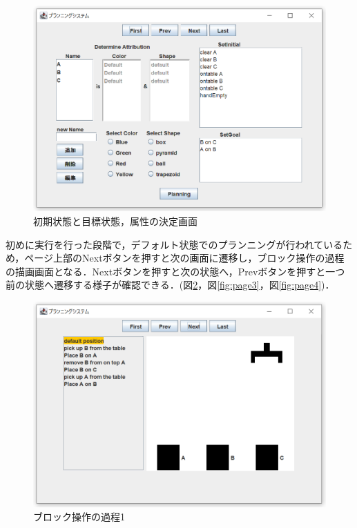 \documentclass[uplatex,12pt]{jsarticle}
\begin{document}
\begin{figure}[htbp]
  \begin{center}
    \includegraphics[scale=0.6]{images/page1.PNG}
    \caption{初期状態と目標状態，属性の決定画面}
    \label{fig:page1}
  \end{center}
\end{figure}
\clearpage
初めに実行を行った段階で，デフォルト状態でのプランニングが行われているため，ページ上部のNextボタンを押すと次の画面に遷移し，ブロック操作の過程の描画画面となる．Nextボタンを押すと次の状態へ，Prevボタンを押すと一つ前の状態へ遷移する様子が確認できる．(図\ref{fig:page2}，図\ref{fig:page3}，図\ref{fig:page4})．\\
\begin{figure}[htbp]
  \begin{center}
    \includegraphics[scale=0.6]{images/page2.PNG}
    \caption{ブロック操作の過程1}
    \label{fig:page2}
  \end{center}
\end{figure}
\end{document}
